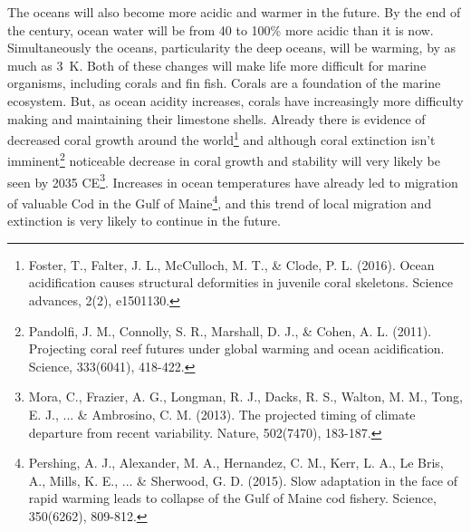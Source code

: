 \documentclass[amstex,12pt]{book}
\begin{document}
The oceans will also become more acidic and warmer in the future. By the end of the century, ocean water will be from 40 to 100\% more acidic than it is now. Simultaneously the oceans, particularity the deep oceans, will be warming, by as much as \SI {3}{\kelvin}. Both of these changes will make life more difficult for marine organisms, including corals and fin fish. Corals are a foundation of the marine ecosystem. But, as ocean acidity increases, corals have increasingly more difficulty making and maintaining their limestone shells. Already there is evidence of decreased coral growth around the world\footnote{Foster, T., Falter, J. L., McCulloch, M. T., \& Clode, P. L. (2016). Ocean acidification causes structural deformities in juvenile coral skeletons. Science advances, 2(2), e1501130.} and although coral extinction isn't imminent\footnote{Pandolfi, J. M., Connolly, S. R., Marshall, D. J., \& Cohen, A. L. (2011). Projecting coral reef futures under global warming and ocean acidification. Science, 333(6041), 418-422.}  noticeable decrease in coral growth and stability will very likely be seen by 2035 CE\footnote{Mora, C., Frazier, A. G., Longman, R. J., Dacks, R. S., Walton, M. M., Tong, E. J., ... \& Ambrosino, C. M. (2013). The projected timing of climate departure from recent variability. Nature, 502(7470), 183-187.}. Increases in ocean temperatures have already led to migration of valuable Cod in the Gulf of Maine\footnote{Pershing, A. J., Alexander, M. A., Hernandez, C. M., Kerr, L. A., Le Bris, A., Mills, K. E., ... \& Sherwood, G. D. (2015). Slow adaptation in the face of rapid warming leads to collapse of the Gulf of Maine cod fishery. Science, 350(6262), 809-812.}, and this trend of local migration and extinction is very likely to continue in the future. 
\end{document}
